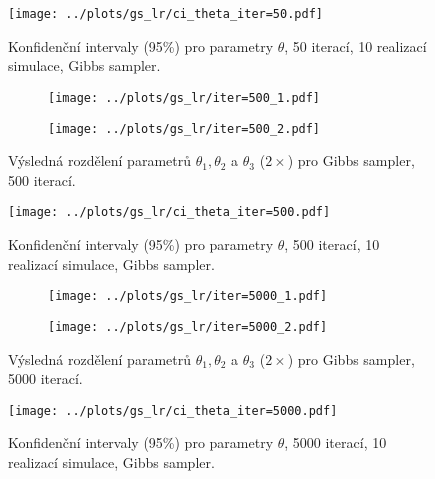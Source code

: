 \documentclass[11pt,oneside,american,czech]{article}
\begin{document}
\begin{figure}
	\centering
	\texttt{[image: ../plots/gs\_lr/ci\_theta\_iter=50.pdf]}
	\caption{Konfidenční intervaly (95\%) pro parametry $\theta$, 50 iterací, 10 realizací simulace, Gibbs sampler.}
	\label{GS LR 50 CI}
\end{figure}

\begin{figure}
	\centering
	\begin{subfigure}{0.95\textwidth}
		\centering
		\texttt{[image: ../plots/gs\_lr/iter=500\_1.pdf]}
	\end{subfigure}
	
	\vspace{1.5cm}
	
	\begin{subfigure}{0.95\textwidth}
		\centering
		\texttt{[image: ../plots/gs\_lr/iter=500\_2.pdf]}
	\end{subfigure}
	\caption{Výsledná rozdělení parametrů $\theta_1, \theta_2$ a $\theta_3$ ($2\times$) pro Gibbs sampler, 500 iterací.}
	\label{Obr: GS LR 500}
\end{figure}

\begin{figure}
	\centering
	\texttt{[image: ../plots/gs\_lr/ci\_theta\_iter=500.pdf]}
	\caption{Konfidenční intervaly (95\%) pro parametry $\theta$, 500 iterací, 10 realizací simulace, Gibbs sampler.}
	\label{GS LR 500 CI}
\end{figure}

\begin{figure}
	\centering
	\begin{subfigure}{0.95\textwidth}
		\centering
		\texttt{[image: ../plots/gs\_lr/iter=5000\_1.pdf]}
	\end{subfigure}
	
	\vspace{1.5cm}
	
	\begin{subfigure}{0.95\textwidth}
		\centering
		\texttt{[image: ../plots/gs\_lr/iter=5000\_2.pdf]}
	\end{subfigure}
	\caption{Výsledná rozdělení parametrů $\theta_1, \theta_2$ a $\theta_3$ ($2\times$) pro Gibbs sampler, 5000 iterací.}
	\label{Obr: GS LR 5000}
\end{figure}

\begin{figure}
	\centering
	\texttt{[image: ../plots/gs\_lr/ci\_theta\_iter=5000.pdf]}
	\caption{Konfidenční intervaly (95\%) pro parametry $\theta$, 5000 iterací, 10 realizací simulace, Gibbs sampler.}
	\label{GS LR 5000 CI}
\end{figure}
\end{document}
